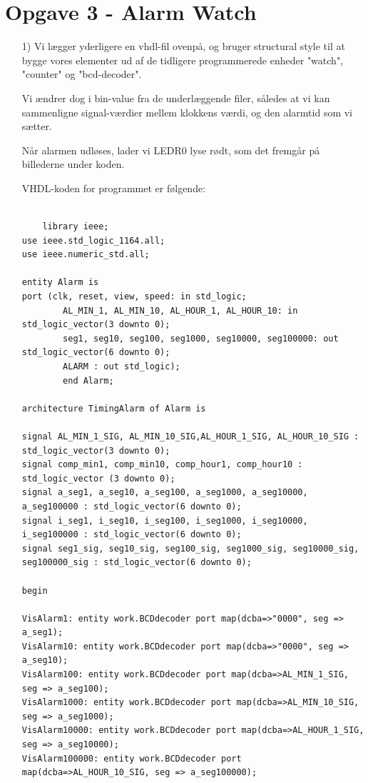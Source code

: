 \clearpage
\section{Opgave 3 - Alarm Watch}
\begin{enumerate}
	\item[1)]
	Vi lægger yderligere en vhdl-fil ovenpå, og bruger structural style til at bygge vores elementer ud af de tidligere programmerede enheder "watch", "counter" og "bcd-decoder". 
	
	Vi ændrer dog i bin-value fra de underlæggende filer, således at vi kan sammenligne signal-værdier mellem klokkens værdi, og den alarmtid som vi sætter. 
	
	Når alarmen udløses, lader vi LEDR0 lyse rødt, som det fremgår på billederne under koden.

	VHDL-koden for programmet er følgende:
	
	\begin{lstlisting}[caption={Koden for øverste lag af Alarm Watch},label={lst:alarmWatch}]
		
	library ieee;
use ieee.std_logic_1164.all;
use ieee.numeric_std.all;

entity Alarm is
port (clk, reset, view, speed: in std_logic;
		AL_MIN_1, AL_MIN_10, AL_HOUR_1, AL_HOUR_10: in std_logic_vector(3 downto 0);
		seg1, seg10, seg100, seg1000, seg10000, seg100000: out std_logic_vector(6 downto 0);
		ALARM : out std_logic);
		end Alarm;
		
architecture TimingAlarm of Alarm is

signal AL_MIN_1_SIG, AL_MIN_10_SIG,AL_HOUR_1_SIG, AL_HOUR_10_SIG : std_logic_vector(3 downto 0);
signal comp_min1, comp_min10, comp_hour1, comp_hour10 : std_logic_vector (3 downto 0);
signal a_seg1, a_seg10, a_seg100, a_seg1000, a_seg10000, a_seg100000 : std_logic_vector(6 downto 0);
signal i_seg1, i_seg10, i_seg100, i_seg1000, i_seg10000, i_seg100000 : std_logic_vector(6 downto 0);
signal seg1_sig, seg10_sig, seg100_sig, seg1000_sig, seg10000_sig, seg100000_sig : std_logic_vector(6 downto 0);

begin

VisAlarm1: entity work.BCDdecoder port map(dcba=>"0000", seg => a_seg1);
VisAlarm10: entity work.BCDdecoder port map(dcba=>"0000", seg => a_seg10);
VisAlarm100: entity work.BCDdecoder port map(dcba=>AL_MIN_1_SIG, seg => a_seg100);
VisAlarm1000: entity work.BCDdecoder port map(dcba=>AL_MIN_10_SIG, seg => a_seg1000);
VisAlarm10000: entity work.BCDdecoder port map(dcba=>AL_HOUR_1_SIG, seg => a_seg10000);
VisAlarm100000: entity work.BCDdecoder port map(dcba=>AL_HOUR_10_SIG, seg => a_seg100000);


\end{lstlisting}
\end{enumerate}
